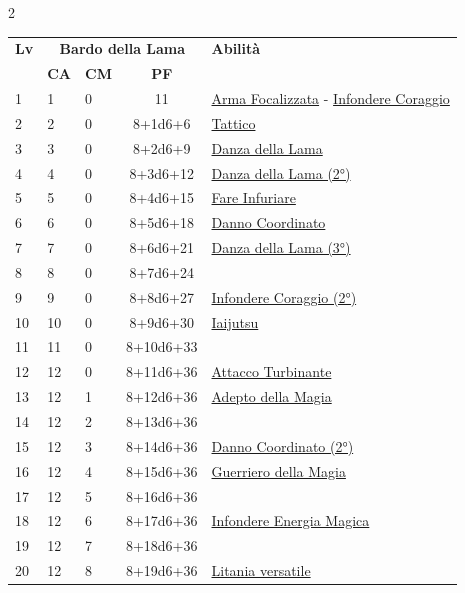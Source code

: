 {\begin{multicols}{2}


\noindent\begin{tabularx}{\linewidth}{p{0.55cm}|p{0.55cm}p{0.55cm}c|X|}
	\toprule
 \rowcolor{gray!20}	\textbf{Lv} & \multicolumn{3}{c|}{\textbf{Bardo della Lama}} & \textbf{Abilità} \\
& \centering\arraybackslash \textbf{CA} & \centering\arraybackslash \textbf{CM} & \centering\arraybackslash \textbf{PF} & \\
	\toprule
	1 & 1 & 0 & 11 & \hyperlink{Arma Focalizzata}{Arma Focalizzata} - \hyperlink{Infondere Coraggio}{Infondere Coraggio}\\
	\rowcolor{gray!20}2 & 2 & 0 & 8+1d6+6 & \hyperlink{Tattico}{Tattico}\\
	3 & 3 & 0 & 8+2d6+9 & \hyperlink{Danza della Lama}{Danza della Lama}\\
	\rowcolor{gray!20}4 & 4 & 0 & 8+3d6+12 & \hyperlink{Danza della Lama}{Danza della Lama (2°)}\\
	5 & 5 & 0 & 8+4d6+15 & \hyperlink{Fare Infuriare}{Fare Infuriare}\\
	\rowcolor{gray!20}6 & 6 & 0 & 8+5d6+18 & \hyperlink{Danno Coordinato}{Danno Coordinato}\\
	7 & 7 & 0 & 8+6d6+21 & \hyperlink{Danza della Lama}{Danza della Lama (3°)}\\
	\rowcolor{gray!20}8 & 8 & 0 & 8+7d6+24 & \\
	9 & 9 & 0 & 8+8d6+27 & \hyperlink{Infondere Coraggio}{Infondere Coraggio (2°)}\\
	\rowcolor{gray!20}10 & 10 & 0 & 8+9d6+30 & \hyperlink{Iaijutsu}{Iaijutsu}\\
	11 & 11 & 0 & 8+10d6+33 & \\
	\rowcolor{gray!20}12 & 12 & 0 & 8+11d6+36 & \hyperlink{Attacco Turbinante}{Attacco Turbinante}\\
	13 & 12 & 1 & 8+12d6+36 & \hyperlink{Adepto della Magia}{Adepto della Magia}\\
	\rowcolor{gray!20}14 & 12 & 2 & 8+13d6+36 & \\
	15 & 12 & 3 & 8+14d6+36 & \hyperlink{Danno Coordinato}{Danno Coordinato (2°)}\\
	\rowcolor{gray!20}16 & 12 & 4 & 8+15d6+36 & \hyperlink{Guerriero della Magia}{Guerriero della Magia}\\
	17 & 12 & 5 & 8+16d6+36 & \\
	\rowcolor{gray!20}18 & 12 & 6 & 8+17d6+36 & \hyperlink{Infondere Energia Magica}{Infondere Energia Magica}\\
	19 & 12 & 7 & 8+18d6+36 & \\
	\rowcolor{gray!20}20 & 12 & 8 & 8+19d6+36 & \hyperlink{Litania versatile}{Litania versatile}\\
\end{tabularx}


\end{multicols}}
